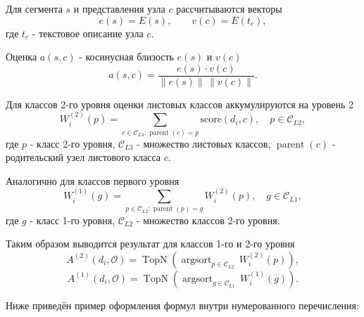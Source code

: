 Для сегмента $s$ и представления узла $c$ рассчитываются векторы
\begin{equation}
e(s)=E(s),\qquad v(c)=E(t_c),
\end{equation}
\noindent где $t_c$ - текстовое описание узла $c$.

Оценка $a(s,c)$ - косинусная близость $e(s)$ и $v(c)$
\begin{equation}
\label{eq:a-cosine}
a(s,c) =
\frac{e(s)\cdot v(c)}{\|e(s)\|\,\|v(c)\|}.
\end{equation}

Для классов 2-го уровня оценки листовых классов аккумулируются на уровень 2
\begin{equation}
W^{(2)}_{i}(p) = \sum_{c \in \mathcal{C}_{L3}: \operatorname{parent}(c)=p} \mathrm{score}(d_i,c), \quad p \in \mathcal{C}_{L2},
\end{equation}
\noindent где $p$ - класс 2-го уровня, $\mathcal{C}_{L3}$ - множество листовых классов, $\operatorname{parent}(c)$ - родительский узел листового класса $c$.

Аналогично для классов первого уровня
\begin{equation}
W^{(1)}_{i}(g) = \sum_{p \in \mathcal{C}_{L2}: \operatorname{parent}(p)=g} W^{(2)}_{i}(p), \quad g \in \mathcal{C}_{L1},
\end{equation}
\noindent где $g$ - класс 1-го уровня, $\mathcal{C}_{L2}$ - множество классов 2-го уровня.

Таким образом выводится результат для классов 1-го и 2-го уровня
\begin{equation}
A^{(2)}(d_i,\mathcal{O})=
\operatorname{TopN}\!\left(
\operatorname{argsort}_{p\in\mathcal{C}_{L2}}\, W_i^{(2)}(p)
\right),
\end{equation}
\begin{equation}
A^{(1)}(d_i,\mathcal{O})=
\operatorname{TopN}\!\left(
\operatorname{argsort}_{g\in\mathcal{C}_{L1}}\, W_i^{(1)}(g)
\right).
\end{equation}

Ниже приведён пример оформления формул внутри нумерованного перечисления:

